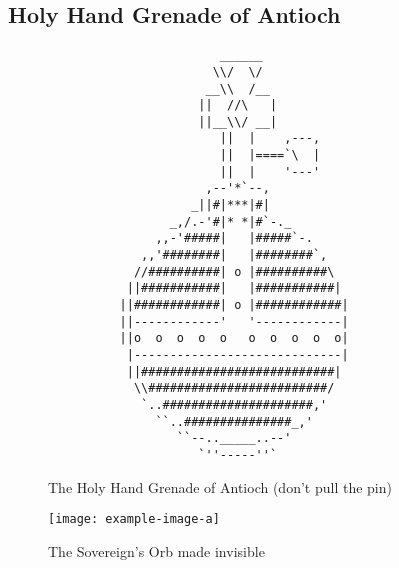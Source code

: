 \documentclass{metanorma}
\begin{document}


\subsection{Holy Hand Grenade of Antioch}
\label{holy_hand_grenade}



\begin{figure}[h]\centering
\label{hand-grenade-figure}
\caption{The Holy Hand Grenade of Antioch (don't pull the pin)}
\begin{verbatim}
                        ______
                       \\/  \/
                      __\\  /__
                     ||  //\   |
                     ||__\\/ __|
                        ||  |    ,---,
                        ||  |====`\  |
                        ||  |    '---'
                      ,--'*`--,
                    _||#|***|#|
                 _,/.-'#|* *|#`-._
               ,,-'#####|   |#####`-.
             ,,'########|   |########`,
            //##########| o |##########\
           ||###########|   |###########|
          ||############| o |############|
          ||------------'   '------------|
          ||o  o  o  o  o   o  o  o  o  o|
           |-----------------------------|
           ||###########################|
            \\#########################/
             `..#####################,'
               ``..###############_,'
                  ``--.._____..--'
                     `''-----''`
\end{verbatim}
\end{figure}




\begin{figure}[h]\centering
  \label{sovereign-orb}
  \caption{The Sovereign's Orb made invisible}
  \texttt{[image: example-image-a]}
\end{figure}
\end{document}
